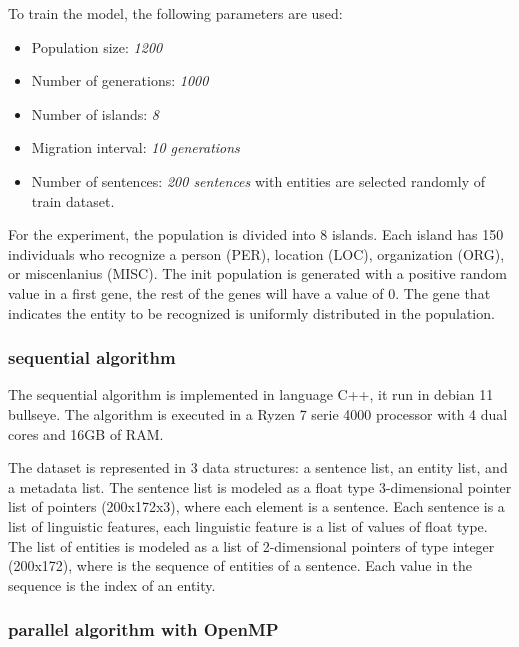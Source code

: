 \documentclass{IEEEtran}
\begin{document}
To train the model, the following parameters are used:
\begin{itemize}
  \item Population size: \textit{1200}
  \item Number of generations: \textit{1000}
  \item Number of islands: \textit{8}
  \item Migration interval: \textit{10 generations}
  \item Number of sentences: \textit{200 sentences} with entities are selected randomly of train dataset.
\end{itemize}



For the experiment, the population is divided into 8 islands. Each island has 150 individuals who recognize a person (PER), location (LOC), organization (ORG), or miscenlanius (MISC). The init population is generated with a positive random value in a first gene, the rest of the genes will have a value of 0. The gene that indicates the entity to be recognized is uniformly distributed in the population.

\subsubsection{sequential algorithm}

The sequential algorithm is implemented in language C++, it run in debian 11 bullseye. The algorithm is executed in a Ryzen 7 serie 4000 processor with 4 dual cores and 16GB of RAM.

The dataset is represented in 3 data structures: a sentence list, an entity list, and a metadata list.
The sentence list is modeled as a float type 3-dimensional pointer list of pointers (200x172x3), where each element is a sentence. Each sentence is a list of linguistic features, each linguistic feature is a list of values of float type. The list of entities is modeled as a list of 2-dimensional pointers of type integer (200x172), where is the sequence of entities of a sentence. Each value in the sequence is the index of an entity.


\subsubsection{parallel algorithm with OpenMP}
\end{document}
